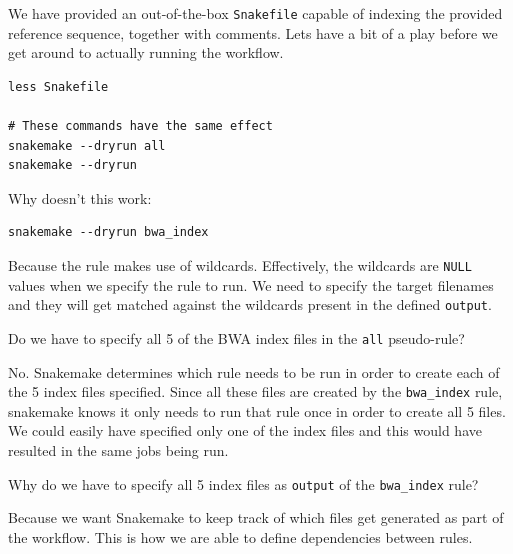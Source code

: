 We have provided an out-of-the-box \texttt{Snakefile} capable of indexing the provided reference sequence, together with comments. Lets
have a bit of a play before we get around to actually running the workflow.

\begin{lstlisting}
less Snakefile

# These commands have the same effect
snakemake --dryrun all
snakemake --dryrun
\end{lstlisting}


\begin{questions}

Why doesn't this work:

\begin{lstlisting}
snakemake --dryrun bwa_index
\end{lstlisting}

\begin{answer}

Because the rule makes use of wildcards. Effectively, the wildcards are \texttt{NULL} values when
we specify the rule to run. We need to specify the target filenames and they will get matched against
the wildcards present in the defined \texttt{output}.

\end{answer}

Do we have to specify all 5 of the BWA index files in the \texttt{all} pseudo-rule?

\begin{answer}

No. Snakemake determines which rule needs to be run in order to create each of the 5 index files specified. Since all these files
are created by the \texttt{bwa\_index} rule, snakemake knows it only needs to run that rule once in order to create all 5 files.
We could easily have specified only one of the index files and this would have resulted in the same jobs being run.

\end{answer}

Why do we have to specify all 5 index files as \texttt{output} of the \texttt{bwa\_index} rule?

\begin{answer}

Because we want Snakemake to keep track of which files get generated as part of the workflow. This is how we are able to define
dependencies between rules.

\end{answer}

\end{questions}


